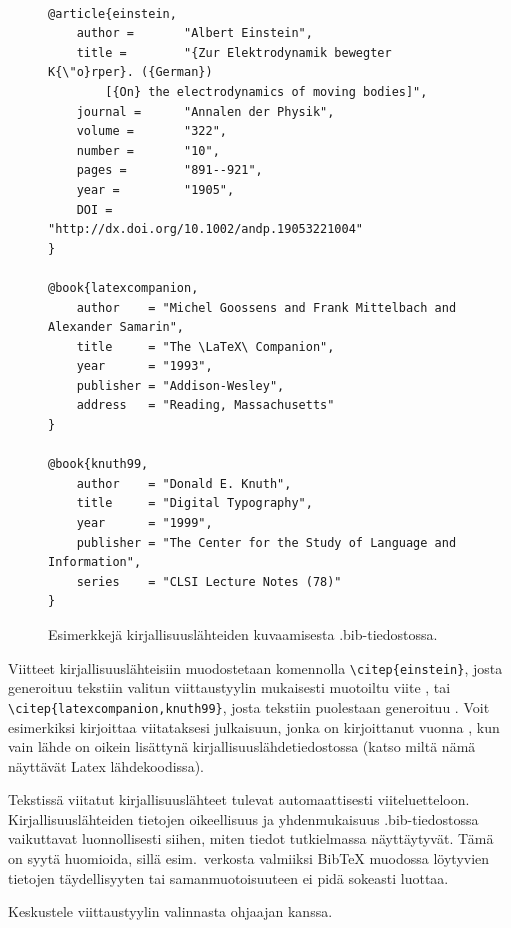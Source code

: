 \begin{figure}[ht]
    \centering
    \begin{scriptsize}
\begin{verbatim}

@article{einstein,
    author =       "Albert Einstein",
    title =        "{Zur Elektrodynamik bewegter K{\"o}rper}. ({German})
        [{On} the electrodynamics of moving bodies]",
    journal =      "Annalen der Physik",
    volume =       "322",
    number =       "10",
    pages =        "891--921",
    year =         "1905",
    DOI =          "http://dx.doi.org/10.1002/andp.19053221004"
}

@book{latexcompanion,
    author    = "Michel Goossens and Frank Mittelbach and Alexander Samarin",
    title     = "The \LaTeX\ Companion",
    year      = "1993",
    publisher = "Addison-Wesley",
    address   = "Reading, Massachusetts"
}

@book{knuth99,
    author    = "Donald E. Knuth",
    title     = "Digital Typography",
    year      = "1999",
    publisher = "The Center for the Study of Language and Information",
    series    = "CLSI Lecture Notes (78)"
}
\end{verbatim}
\end{scriptsize}
    \caption{Esimerkkejä kirjallisuuslähteiden kuvaamisesta .bib-tiedostossa.}
    \label{bibexamples-fi}
\end{figure}

Viitteet kirjallisuuslähteisiin muodostetaan komennolla \texttt{\textbackslash citep\{einstein\}}, josta generoituu tekstiin valitun viittaustyylin mukaisesti muotoiltu viite \citep{einstein}, tai \texttt{\textbackslash citep\{latexcompanion,knuth99\}}, josta tekstiin puolestaan generoituu \citep{latexcompanion,knuth99}.
Voit esimerkiksi kirjoittaa \citep{einstein} viitataksesi julkaisuun, jonka on kirjoittanut \citeauthor{einstein} vuonna \citeyear{einstein}, kun vain lähde \citet{einstein} on oikein lisättynä kirjallisuuslähdetiedostossa (katso miltä nämä näyttävät Latex lähdekoodissa).

Tekstissä viitatut kirjallisuuslähteet tulevat automaattisesti viiteluetteloon. Kirjallisuuslähteiden tietojen oikeellisuus ja yhdenmukaisuus .bib-tiedostossa vaikuttavat luonnollisesti siihen, miten tiedot tutkielmassa näyttäytyvät. Tämä on syytä huomioida, sillä esim.\ verkosta valmiiksi {Bib\TeX} muodossa löytyvien tietojen täydellisyyten tai samanmuotoisuuteen ei pidä sokeasti luottaa.


Keskustele viittaustyylin valinnasta ohjaajan kanssa.

